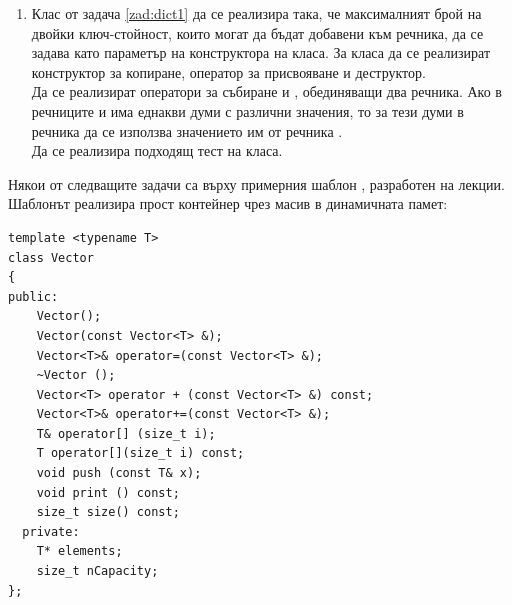 \begin{enumerate}[resume]
  \item Клас  от задача \ref{zad:dict1} да се реализира така, че максималният брой  на двойки ключ-стойност, които могат да бъдат добавени към речника, да се задава като параметър на конструктора на класа. За класа да се реализират конструктор за копиране, оператор за присвояване и деструктор.\\

 Да се реализират оператори за събиране \code{+} и \code{+=}, обединяващи два речника. Ако в речниците  и  има еднакви думи с различни значения, то за тези думи в речника  да се използва значението им от речника . \\

 Да се реализира подходящ тест на класа.

\end{enumerate}
\begin{mdframed}[hidealllines=true,backgroundcolor=gray!20]
Някои от следващите задачи са върху примерния шаблон , разработен на лекции. Шаблонът реализира прост контейнер чрез масив в динамичната памет:
\begin{verbatim}
template <typename T>
class Vector
{
public:
    Vector();
    Vector(const Vector<T> &);
    Vector<T>& operator=(const Vector<T> &);
    ~Vector ();
    Vector<T> operator + (const Vector<T> &) const;
    Vector<T>& operator+=(const Vector<T> &);
    T& operator[] (size_t i);
    T operator[](size_t i) const;
    void push (const T& x);
    void print () const;
    size_t size() const;
  private:
    T* elements;
    size_t nCapacity;
};

\end{verbatim}
\end{mdframed}
